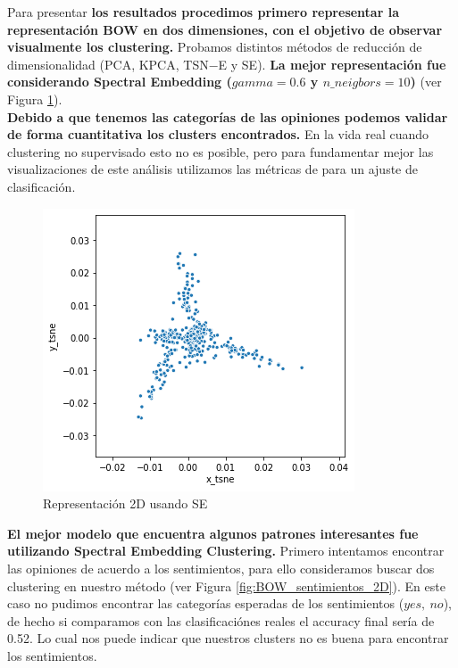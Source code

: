 \documentclass[paper=letter, fontsize=11pt]{scrartcl}
\numberwithin{equation}{section} %
\numberwithin{figure}{section} %
\numberwithin{table}{section} %
\begin{document}
Para presentar \textbf{los resultados procedimos primero representar la representación BOW en dos dimensiones, con el objetivo de observar visualmente los clustering.} Probamos distintos métodos de reducción de dimensionalidad (PCA, KPCA, TSN$-$E y SE). \textbf{La mejor representación fue considerando Spectral Embedding ($gamma=0.6$ y $n\_neigbors=10$)} (ver Figura \ref{fig:BOW_2D}). \\
\textbf{Debido a que tenemos las categorías de las opiniones podemos validar de forma cuantitativa los clusters encontrados.} En la vida real cuando clustering no supervisado esto no es posible, pero para fundamentar mejor las visualizaciones de este análisis utilizamos las métricas de para un ajuste de clasificación.
\begin{figure}[H]
    \centering
    \includegraphics[scale=0.6]{figure/BOW_2D.png}
    \caption{Representación 2D usando SE}
    \label{fig:BOW_2D}
\end{figure}
\textbf{El mejor modelo que encuentra algunos patrones interesantes fue utilizando Spectral Embedding Clustering.} Primero intentamos encontrar las opiniones de acuerdo a los sentimientos, para ello consideramos buscar dos clustering en nuestro método (ver Figura \ref{fig:BOW_sentimientos_2D}). En este caso no pudimos encontrar las categorías esperadas de los sentimientos ($yes,\ no$), de hecho si comparamos con las clasificaciónes reales el accuracy final sería de 0.52. Lo cual nos puede indicar que nuestros clusters no es buena para encontrar los sentimientos.
\end{document}
